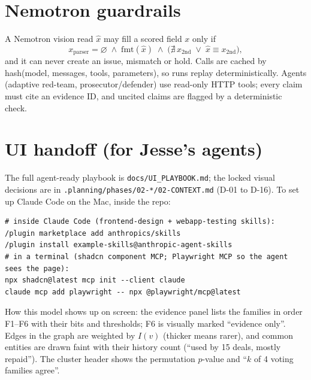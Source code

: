 \documentclass[11pt]{article}
\begin{document}
\section{Nemotron guardrails}
A Nemotron vision read $\hat x$ may fill a scored field $x$ only if
\begin{equation}
x_{\text{parser}}=\varnothing\;\wedge\;\mathrm{fmt}(\hat x)\;\wedge\;\big(\nexists\,x_{\text{2nd}}\;\vee\;\hat x\equiv x_{\text{2nd}}\big),
\end{equation}
and it can never create an issue, mismatch or hold. Calls are cached by hash(model, messages, tools, parameters), so runs replay deterministically.
Agents (adaptive red-team, prosecutor/defender) use read-only HTTP tools; every claim must cite an evidence ID, and uncited claims are flagged by a deterministic check.

\appendix
\section{UI handoff (for Jesse's agents)}
The full agent-ready playbook is \texttt{docs/UI\_PLAYBOOK.md}; the locked visual decisions are in \texttt{.planning/phases/02-*/02-CONTEXT.md} (D-01 to D-16). To set up Claude Code on the Mac, inside the repo:
{\small
\begin{verbatim}
# inside Claude Code (frontend-design + webapp-testing skills):
/plugin marketplace add anthropics/skills
/plugin install example-skills@anthropic-agent-skills
# in a terminal (shadcn component MCP; Playwright MCP so the agent sees the page):
npx shadcn@latest mcp init --client claude
claude mcp add playwright -- npx @playwright/mcp@latest
\end{verbatim}}
How this model shows up on screen: the evidence panel lists the families in order F1--F6 with their bits and thresholds; F6 is visually marked ``evidence only''. Edges in the graph are weighted by $I(v)$ (thicker means rarer), and common entities are drawn faint with their history count (``used by 15 deals, mostly repaid''). The cluster header shows the permutation $p$-value and ``$k$ of 4 voting families agree''.
\end{document}
